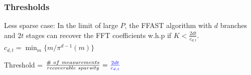 \documentclass[10pt,xcolor=table]{beamer}
\begin{document}
\begin{frame}\frametitle{Thresholds}
%
\begin{theorem}\label{thm:thresh}
Less sparse case: In the limit of large $P$, the FFAST algorithm with $d$ branches and $2t$ stages can recover the FFT coefficients w.h.p if $K < \frac{2dt}{c_{d,t}}$. \\
\vspace{2mm}
\centering
\color{blue} $c_{d,t} = \min_m \{ m / \pi^{d-1}(m)\} $
\end{theorem}
\begin{block}{}

\begin{center}
\alert{Threshold} = $ \frac{\# \ of \ measurements}{recoverable \ sparsity}={\color{blue} \frac{2dt}{c_{d,t}}}$
\end{center}


\end{block}
\end{frame}
\end{document}
